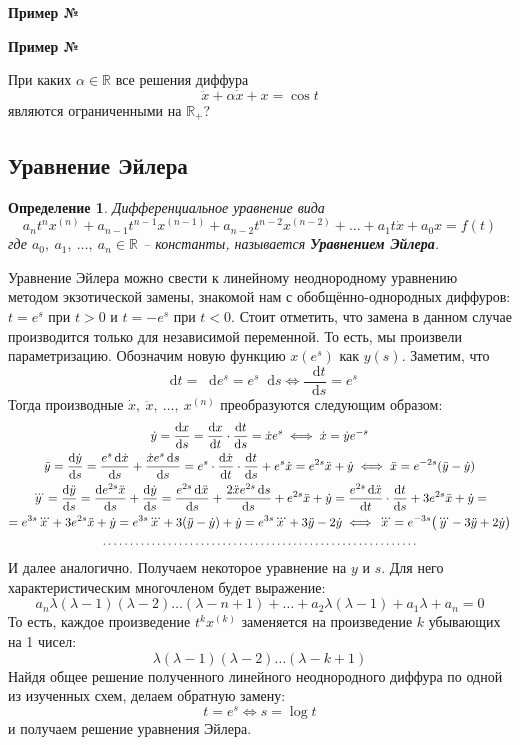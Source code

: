 \documentclass[a4paper,12pt]{article}
\newcommand{\dotffill}[1]{\parbox[t]{#1}{\dotfill}}
\newtheorem{definition}{Определение}
\newcommand{\R}{\mathbb{R}}
\renewcommand*\d{\mathop{}\!\mathrm{d}}
\newcommand{\dy}{\dot{y}}
\newcommand{\ddy}{\ddot{y}}
\newcommand{\dddy}{\dddot{y}}
\newcommand{\dx}{\dot{x}}
\newcommand{\ddx}{\ddot{x}}
\newcommand{\dddx}{\dddot{x}}
\begin{document}
\textbf{Пример №}

\textbf{Пример №}

При каких $\alpha \in \R$ все решения диффура
\[\ddx + \alpha\dx + x = \cos t\] являются ограниченными на $\R_+$?

\subsection{Уравнение Эйлера}

\begin{definition}
	Дифференциальное уравнение вида
	\[a_nt^nx^{(n)} + a_{n - 1}t^{n - 1}x^{(n - 1)} + a_{n - 2}t^{n - 2}x^{(n - 2)} + \ldots + a_1t\dx + a_0 x = f(t)\]
	где $a_0,\ a_1,\ \ldots,\ a_n \in \R$ -- константы, называется \textbf{Уравнением Эйлера}.
\end{definition}
Уравнение Эйлера можно свести к линейному неоднородному уравнению методом экзотической замены, знакомой нам с обобщённо-однородных диффуров: $t = e^{s}$ при $t > 0$  и $t = - e^s$ при $t < 0$. Стоит отметить, что замена в данном случае производится только для независимой переменной. То есть, мы произвели параметризацию. Обозначим новую функцию $x\left(e^s\right)$ как $y(s)$. Заметим, что \[\d t = \d e^s = e^s \d s \iff \dfrac{\d t}{\d s} = e^s\] Тогда производные $\dx,\ \ddx,\ \ldots,\ x^{(n)}$ преобразуются следующим образом:
\begin{gather*}
\dy = \dfrac{\d x}{\d s} = \dfrac{\d x}{\d t} \cdot \dfrac{\d t}{\d s}= \dx e^s \iff \dx = \dy e^{-s}\\
\ddy = \dfrac{\d \dy}{\d s} = \dfrac{e^s\d \dx}{\d s} + \dfrac{\dx e^s\d s}{\d s} = e^s\cdot \dfrac{\d \dx}{\d t}\cdot \dfrac{\d t}{\d s} + e^s\dx = e^{2s}\ddx + \dy \iff \ddx = e^{-2s}(\ddy - \dy)\\
\dddy = \dfrac{\d \ddy}{\d s} = \dfrac{\d e^{2s}\ddx}{\d s} + \dfrac{\d \dy}{\d s} = \dfrac{e^{2s}\d \ddx}{\d s} + \dfrac{2\ddx e^{2s}\d s}{\d s} + e^{2s}\ddx + \dy = \dfrac{e^{2s}\d \ddx}{\d t}\cdot \dfrac{\d t}{\d s} + 3e^{2s}\ddx + \dy = \\
= e^{3s}\dddx + 3e^{2s}\ddx + \dy = e^{3s}\dddx + 3(\ddy - \dy) + \dy = e^{3s}\dddx + 3\ddy - 2\dy \iff \dddx = e^{-3s}\big(\dddy - 3\ddy + 2\dy\big)\\
\dotffill{0.75\textwidth}\\
\end{gather*}
И далее аналогично. Получаем некоторое уравнение на $y$ и $s$. Для него характеристическим многочленом будет выражение:
\[a_n\lambda(\lambda - 1)(\lambda - 2)\ldots(\lambda - n + 1) + \ldots + a_2\lambda(\lambda - 1) + a_1\lambda + a_n = 0\]
То есть, каждое произведение $t^kx^{(k)}$ заменяется на произведение $k$ убывающих на 1 чисел:
\[\lambda(\lambda - 1)(\lambda - 2)\ldots(\lambda - k + 1)\]
Найдя общее решение полученного линейного неоднородного диффура по одной из изученных схем, делаем обратную замену:
\[t = e^s \iff s = \log t\]
и получаем решение уравнения Эйлера.
\ \\
\end{document}

